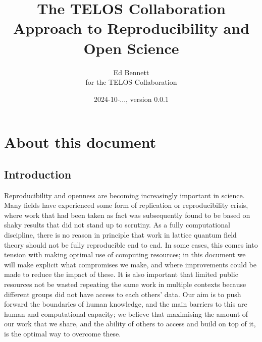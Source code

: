 \documentclass{article}
\title{The TELOS Collaboration Approach to Reproducibility and Open Science}
\author{Ed Bennett\\for the TELOS Collaboration}
\date{2024-10-..., version 0.0.1}
\begin{document}
\maketitle


\makeatletter
\renewcommand\tableofcontents{%
    \subsection{\contentsname
        \@mkboth{%
           \MakeUppercase\contentsname}{\MakeUppercase\contentsname}}%
    \@starttoc{toc}%
  }
\makeatother

\section{About this document}

\subsection{Introduction}

Reproducibility and openness are becoming increasingly important in science.
Many fields have experienced some form of replication or reproducibility crisis,
where work that had been taken as fact was subsequently found
to be based on shaky results that did not stand up to scrutiny.
As a fully computational discipline,
there is no reason in principle
that work in lattice quantum field theory should not be fully reproducible end to end.
In some cases,
this comes into tension with making optimal use of computing resources;
in this document we will make explicit what compromises we make,
and where improvements could be made to reduce the impact of these.
It is also important that limited public resources not be wasted
repeating the same work in multiple contexts
because different groups did not have access to each others' data.
Our aim is to push forward the boundaries of human knowledge,
and the main barriers to this are human and computational capacity;
we believe that maximising the amount of our work that we share,
and the ability of others to access and build on top of it,
is the optimal way to overcome these.
\end{document}
